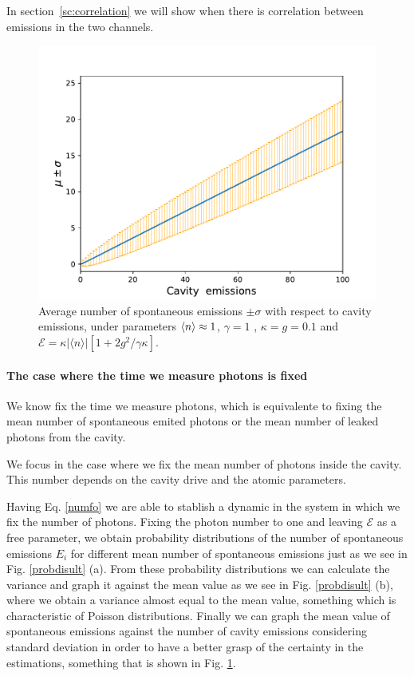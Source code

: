 \documentclass[%
 reprint,
 amsmath,amssymb,
 aps, 
]{revtex4-2}
\begin{document}
In section~\ref{sc:correlation} we will show
when there is correlation between emissions in the two channels.


\begin{figure}[!b]  
\centering
\includegraphics[scale = 0.5]{newsigmaengg.pdf}
\caption{\small{Average number of spontaneous emissions $\pm \sigma$ with respect to cavity emissions, under parameters $\expval{n} \approx 1$, $\gamma = 1$ , $\kappa = g = 0.1$ and $\mathcal{E} =  \kappa |\langle n \rangle|[1 + 2g^2/\gamma \kappa]$.}}
\label{graph}
\end{figure} 


\paragraph{The case where the time we measure photons is fixed}

We know fix the time we measure photons, which is equivalente to
fixing the mean number of spontaneous emited photons or the mean number
of leaked photons from the cavity. 

We focus in the case where we fix the mean number of photons inside
the cavity. This number depends on the cavity drive and the atomic
parameters.


Having Eq. \eqref{numfo} we are able to stablish a dynamic in the system in which we fix the number of photons. Fixing the photon number to one and leaving $\mathcal{E}$ as a free parameter, we obtain probability distributions of the number of spontaneous emissions $E_i$ for different mean number of spontaneous emissions just as we see in Fig. \ref{probdisult} (a). From these probability distributions we can calculate the variance and graph it against the mean value as we see in Fig. \ref{probdisult} (b), where we obtain a variance almost equal to the mean value, something which is characteristic of Poisson distributions. 
Finally we can graph the mean value of spontaneous emissions against the number of cavity emissions considering standard deviation in order to have a better grasp of the certainty in the estimations, something that is shown in Fig. \ref{graph}.
\end{document}
